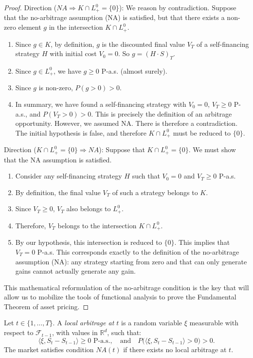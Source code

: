 \begin{proof}
Direction ($NA \Rightarrow K \cap L^0_+ = \{0\}$): We reason by contradiction. Suppose that the no-arbitrage assumption (NA) is satisfied, but that there exists a non-zero element $g$ in the intersection $K \cap L^0_+$.
\begin{enumerate}
    \item Since $g \in K$, by definition, $g$ is the discounted final value $V_T$ of a self-financing strategy $H$ with initial cost $V_0 = 0$. So $g = (H \cdot S)_T$.
    \item Since $g \in L^0_+$, we have $g \ge 0$ P-a.s. (almost surely).
    \item Since $g$ is non-zero, $P(g > 0) > 0$.
    \item In summary, we have found a self-financing strategy with $V_0 = 0$, $V_T \ge 0$ P-a.s., and $P(V_T > 0) > 0$. This is precisely the definition of an arbitrage opportunity. However, we assumed NA. There is therefore a contradiction. The initial hypothesis is false, and therefore $K \cap L^0_+$ must be reduced to $\{0\}$.
\end{enumerate}

Direction ($K \cap L^0_+ = \{0\} \Rightarrow NA$): Suppose that $K \cap L^0_+ = \{0\}$. We must show that the NA assumption is satisfied.
\begin{enumerate}
    \item Consider any self-financing strategy $H$ such that $V_0 = 0$ and $V_T \ge 0$ P-a.s.
    \item By definition, the final value $V_T$ of such a strategy belongs to $K$.
    \item Since $V_T \ge 0$, $V_T$ also belongs to $L^0_+$.
    \item Therefore, $V_T$ belongs to the intersection $K \cap L^0_+$.
    \item By our hypothesis, this intersection is reduced to $\{0\}$. This implies that $V_T = 0$ P-a.s. This corresponds exactly to the definition of the no-arbitrage assumption (NA): any strategy starting from zero and that can only generate gains cannot actually generate any gain.
\end{enumerate}

This mathematical reformulation of the no-arbitrage condition is the key that will allow us to mobilize the tools of functional analysis to prove the Fundamental Theorem of asset pricing.
\end{proof}

\begin{definition}
Let $t \in \{1, \dots, T\}$.  
A \emph{local arbitrage at $t$} is a random variable $\xi$ measurable with respect to $\mathcal{F}_{t-1}$, with values in $\mathbb{R}^d$, such that:
\[
\langle \xi, S_t - S_{t-1} \rangle \ge 0 \text{ P-a.s.}, 
\quad \text{and} \quad P\bigl( \langle \xi, S_t - S_{t-1} \rangle > 0 \bigr) > 0.
\]
The market satisfies condition $NA(t)$ if there exists no local arbitrage at $t$.
\end{definition}


